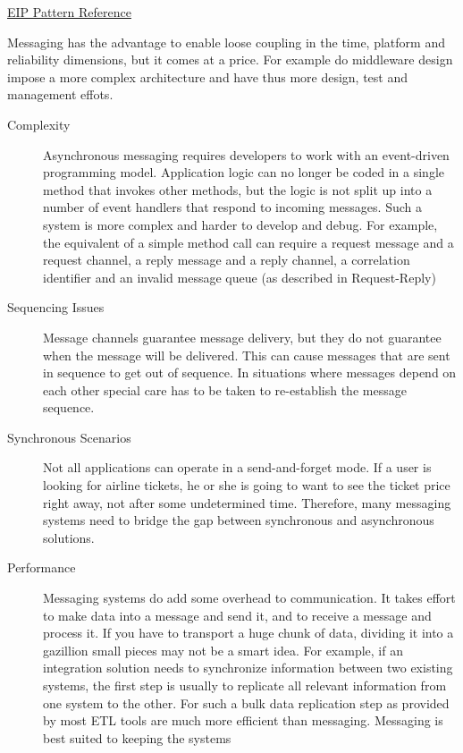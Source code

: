 \documentclass[../Main.tex]{subfiles}
\begin{document}
\href{https://www.enterpriseintegrationpatterns.com/ramblings/eip1_examples_updated.html}{EIP Pattern Reference}

Messaging has the advantage to enable loose coupling in the time, platform and reliability dimensions, but it comes at a price.
For example do middleware design impose a more complex architecture and have thus more design, test and management effots.

\begin{description}
    \item[Complexity] Asynchronous messaging requires developers to work with an event-driven programming model. 
    Application logic can no longer be coded in a single method that invokes other methods, but the logic is 
    not split up into a number of event handlers that respond to incoming messages. Such a system is more 
    complex and harder to develop and debug. For example, the equivalent of a simple method call can 
    require a request message and a request channel, a reply message and a reply channel, a correlation 
    identifier and an invalid message queue (as described in Request-Reply)
    \item[Sequencing Issues] Message channels guarantee message delivery, but they do not guarantee when the message will be 
    delivered. This can cause messages that are sent in sequence to get out of sequence. In situations 
    where messages depend on each other special care has to be taken to re-establish the message 
    sequence.
    \item[Synchronous Scenarios] Not all applications can operate in a send-and-forget mode. If a user is looking for airline 
    tickets, he or she is going to want to see the ticket price right away, not after some 
    undetermined time. Therefore, many messaging systems need to bridge the gap between 
    synchronous and asynchronous solutions.
    \item[Performance] Messaging systems do add some overhead to communication. It takes effort to make data 
    into a message and send it, and to receive a message and process it. If you have to 
    transport a huge chunk of data, dividing it into a gazillion small pieces may not be a smart 
    idea. For example, if an integration solution needs to synchronize information between two 
    existing systems, the first step is usually to replicate all relevant information from one 
    system to the other. For such a bulk data replication step as provided by most ETL tools 
    are much more efficient than messaging. Messaging is best suited to keeping the systems 

\end{description}
\end{document}
